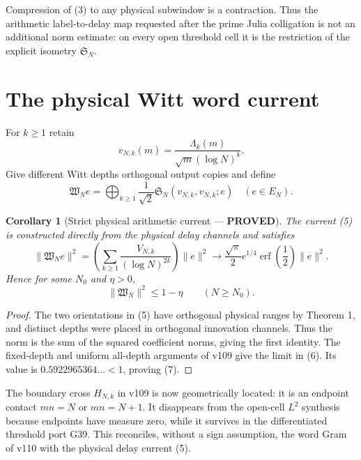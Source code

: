 \documentclass[11pt]{article}
\newcommand{\PROVED}{\textcolor{green!40!black}{\textbf{PROVED}}}
\newtheorem{corollary}{Corollary}
\begin{document}
Compression of (3) to any physical subwindow is a contraction.  Thus the
arithmetic label-to-delay map requested after the prime Julia colligation
is not an additional norm estimate: on every open threshold cell it is the
restriction of the explicit isometry $\mathfrak S_N$.

\section{The physical Witt word current}

For $k\ge1$ retain
\begin{equation}
 v_{N,k}(m)=\frac{\Lambda_k(m)}{\sqrt m(\log N)^k}.             \tag{4}
\end{equation}
Give different Witt depths orthogonal output copies and define
\begin{equation}
 \mathfrak W_Ne=
 \bigoplus_{k\ge1}\frac1{\sqrt2}
 \mathfrak S_N(v_{N,k},v_{N,k};e)
 \quad
 (e\in E_N).                                                   \tag{5}
\end{equation}

\begin{corollary}[Strict physical arithmetic current --- \PROVED]
The current (5) is constructed directly from the physical delay channels
and satisfies
\begin{equation}
 \|\mathfrak W_Ne\|^2
 =\left(\sum_{k\ge1}\frac{V_{N,k}}{(\log N)^{2k}}\right)\|e\|^2
 \longrightarrow
 \frac{\sqrt\pi}{2}e^{1/4}\operatorname{erf}\!\left(\frac12\right)
 \|e\|^2.                                                     \tag{6}
\end{equation}
Hence for some $N_0$ and $\eta>0$,
\begin{equation}
                         \|\mathfrak W_N\|^2\le1-\eta
 \qquad(N\ge N_0).                                           \tag{7}
\end{equation}
\end{corollary}

\begin{proof}
The two orientations in (5) have orthogonal physical ranges by Theorem 1,
and distinct depths were placed in orthogonal innovation channels.  Thus
the norm is the sum of the squared coefficient norms, giving the first
identity.  The fixed-depth and uniform all-depth arguments of v109 give
the limit in (6).  Its value is $0.5922965364\ldots<1$, proving (7).
\end{proof}

The boundary cross $H_{N,k}$ in v109 is now geometrically located: it is
an endpoint contact $mn=N$ or $mn=N+1$.  It disappears from the open-cell
$L^2$ synthesis because endpoints have measure zero, while it survives in
the differentiated threshold port G39.  This reconciles, without a sign
assumption, the word Gram of v110 with the physical delay current (5).
\end{document}
